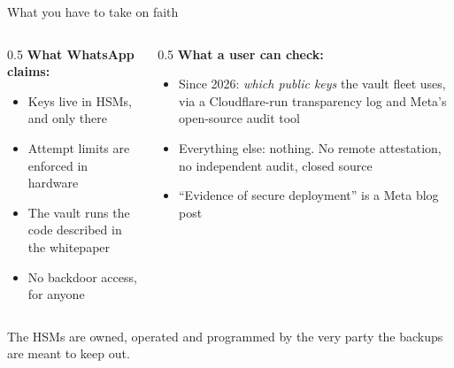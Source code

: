 \ifdefined\PRESENTATION\else\PassOptionsToClass{handout}{beamer}\fi\documentclass[aspectratio=169, lualatex]{beamer}
\begin{document}
\begin{frame}{What you have to take on faith}
	\begin{columns}[c]
		\begin{column}{0.5\textwidth}
			\textbf{What WhatsApp claims:}
			\begin{itemize}
				\item Keys live in HSMs, and only there
				\item Attempt limits are enforced in hardware
				\item The vault runs the code described in the whitepaper
				\item No backdoor access, for anyone
			\end{itemize}
		\end{column}
		\begin{column}{0.5\textwidth}
			\textbf{What a user can check:}
			\begin{itemize}
				\item Since 2026: \textit{which public keys} the vault fleet uses, via a Cloudflare-run transparency log and Meta's open-source audit tool
				\item Everything else: nothing. No remote attestation, no independent audit, closed source
				\item ``Evidence of secure deployment'' is a Meta blog post
			\end{itemize}
		\end{column}
	\end{columns}
	\vspace{0.2cm}
	\begin{center}
		The HSMs are owned, operated and programmed by the very party the backups are meant to keep out.
	\end{center}
\end{frame}
\end{document}
